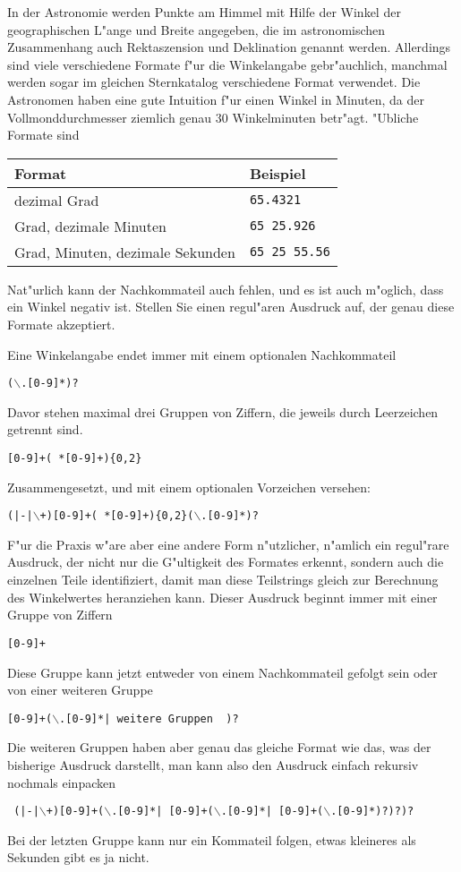 In der Astronomie werden Punkte am Himmel mit Hilfe der Winkel
der geographischen L"ange und Breite angegeben, die im astronomischen
Zusammenhang auch
Rektaszension und Deklination genannt werden.
Allerdings sind viele verschiedene Formate f"ur die
Winkelangabe gebr"auchlich, manchmal werden sogar im gleichen Sternkatalog
verschiedene Format verwendet.
Die Astronomen haben eine gute Intuition f"ur einen Winkel in Minuten,
da der Vollmonddurchmesser ziemlich genau 30 Winkelminuten betr"agt.
"Ubliche Formate sind
\begin{center}
\begin{tabular}{ll}
Format&Beispiel\\
\hline
dezimal Grad&\texttt{65.4321}\\
Grad, dezimale Minuten&\texttt{65 25.926}\\
Grad, Minuten, dezimale Sekunden&\texttt{65 25 55.56}\\
\hline
\end{tabular}
\end{center}
Nat"urlich kann der Nachkommateil auch fehlen, und es ist auch m"oglich, dass
ein Winkel negativ ist.
Stellen Sie einen regul"aren Ausdruck auf, der genau diese Formate
akzeptiert. 

\begin{loesung}
Eine Winkelangabe endet immer mit einem optionalen Nachkommateil
\begin{center}
\tt($\backslash$.[0-9]*)?
\end{center}
Davor stehen maximal drei Gruppen von Ziffern, die jeweils durch
Leerzeichen getrennt sind.
\begin{center}
\tt[0-9]+( *[0-9]+)\{0,2\}
\end{center}
Zusammengesetzt, und mit einem optionalen Vorzeichen versehen:
\begin{center}
\tt (|-|$\backslash$+)[0-9]+( *[0-9]+)\{0,2\}($\backslash$.[0-9]*)?
\end{center}

F"ur die Praxis w"are aber eine andere Form n"utzlicher, n"amlich ein
regul"rare Ausdruck, der nicht nur die G"ultigkeit des Formates
erkennt, sondern auch die einzelnen Teile identifiziert, damit man
diese Teilstrings gleich zur Berechnung des Winkelwertes heranziehen
kann. Dieser Ausdruck beginnt immer mit einer Gruppe von Ziffern
\begin{center}
\tt [0-9]+
\end{center}
Diese Gruppe kann jetzt entweder von einem Nachkommateil gefolgt sein
oder von einer weiteren Gruppe
\begin{center}
\tt [0-9]+($\backslash$.[0-9]*| {\rm weitere Gruppen } )?
\end{center}
Die weiteren Gruppen haben aber genau das gleiche Format wie das,
was der bisherige Ausdruck darstellt, man kann also den Ausdruck einfach
rekursiv nochmals einpacken
\begin{center}
\tt
(|-|$\backslash$+)[0-9]+($\backslash$.[0-9]*| [0-9]+($\backslash$.[0-9]*| [0-9]+($\backslash$.[0-9]*)?)?)?
\end{center}
Bei der letzten Gruppe kann nur ein Kommateil folgen, etwas kleineres
als Sekunden gibt es ja nicht.
\end{loesung}


